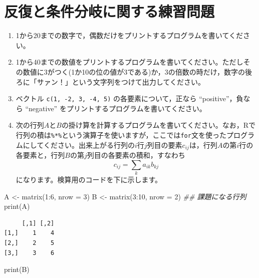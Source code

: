\documentclass[
  a4paper,
]{ltjsbook}
\newenvironment{Shaded}{\begin{snugshade}}{\end{snugshade}}
\newcommand{\AttributeTok}[1]{\textcolor[rgb]{0.40,0.45,0.13}{#1}}
\newcommand{\DecValTok}[1]{\textcolor[rgb]{0.68,0.00,0.00}{#1}}
\newcommand{\DocumentationTok}[1]{\textcolor[rgb]{0.37,0.37,0.37}{\textit{#1}}}
\newcommand{\FunctionTok}[1]{\textcolor[rgb]{0.28,0.35,0.67}{#1}}
\newcommand{\NormalTok}[1]{\textcolor[rgb]{0.00,0.23,0.31}{#1}}
\newcommand{\OtherTok}[1]{\textcolor[rgb]{0.00,0.23,0.31}{#1}}
\newcommand{\SpecialCharTok}[1]{\textcolor[rgb]{0.37,0.37,0.37}{#1}}
\providecommand{\tightlist}{%
  \setlength{\itemsep}{0pt}\setlength{\parskip}{0pt}}
\begin{document}
\section{反復と条件分岐に関する練習問題}\label{ux53cdux5fa9ux3068ux6761ux4ef6ux5206ux5c90ux306bux95a2ux3059ux308bux7df4ux7fd2ux554fux984c}

\begin{enumerate}
\def\labelenumi{\arabic{enumi}.}
\tightlist
\item
  1から20までの数字で，偶数だけをプリントするプログラムを書いてください。
\item
  1から40までの数値をプリントするプログラムを書いてください。ただしその数値に3がつく(1か10の位の値が3である)か，3の倍数の時だけ，数字の後ろに「サァン！」という文字列をつけて出力してください。
\item
  ベクトル \texttt{c(1,\ -2,\ 3,\ -4,\ 5)} の各要素について，正なら
  ``positive''，負なら ``negative''
  をプリントするプログラムを書いてください。
\item
  次の行列\(A\)と\(B\)の掛け算を計算するプログラムを書いてください。なお，Rで行列の積は\texttt{\%*\%}という演算子を使いますが，ここでは\texttt{for}文を使ったプログラムにしてください。出来上がる行列の\(i\)行\(j\)列目の要素\(c_{ij}\)は，行列\(A\)の第\(i\)行の各要素と，行列\(B\)の第\(j\)列目の各要素の積和，すなわち\[c_{ij}=\sum_{k} a_{ik}b_{kj}\]になります。検算用のコードを下に示します。
\end{enumerate}

\begin{Shaded}
\begin{Highlighting}[]
\NormalTok{A }\OtherTok{\textless{}{-}} \FunctionTok{matrix}\NormalTok{(}\DecValTok{1}\SpecialCharTok{:}\DecValTok{6}\NormalTok{, }\AttributeTok{nrow =} \DecValTok{3}\NormalTok{)}
\NormalTok{B }\OtherTok{\textless{}{-}} \FunctionTok{matrix}\NormalTok{(}\DecValTok{3}\SpecialCharTok{:}\DecValTok{10}\NormalTok{, }\AttributeTok{nrow =} \DecValTok{2}\NormalTok{)}
\DocumentationTok{\#\# 課題になる行列}
\FunctionTok{print}\NormalTok{(A)}
\end{Highlighting}
\end{Shaded}

\begin{verbatim}
     [,1] [,2]
[1,]    1    4
[2,]    2    5
[3,]    3    6
\end{verbatim}

\begin{Shaded}
\begin{Highlighting}[]
\FunctionTok{print}\NormalTok{(B)}
\end{Highlighting}
\end{Shaded}
\end{document}
